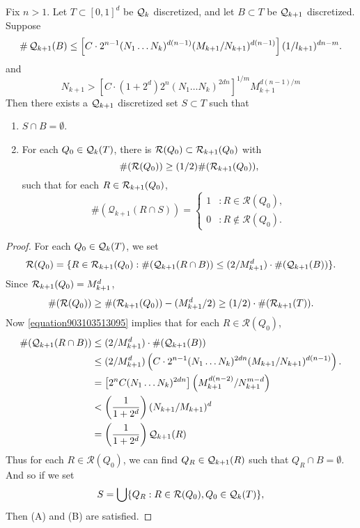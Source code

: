 \begin{lemma} \label{Lemma1209410535}
    Fix $n > 1$. Let $T \subset [0,1]^d$ be $\operatorname{\mathcal{Q}}_k$ discretized, and let $B \subset T$ be $\operatorname{\mathcal{Q}}_{k+1}$ discretized. Suppose
    \[ \# \operatorname{\mathcal{Q}}_{k+1}(B) \leq \left[ C \cdot 2^{n-1} (N_1 \dots N_k)^{d(n-1)} (M_{k+1}/N_{k+1})^{d(n-1)} \right] (1/l_{k+1})^{dn - m}. \]
    and
    \begin{equation} \label{equation903103513095}
        N_{k+1} > \left[ C \cdot (1 + 2^d) 2^n (N_1 \dots N_k)^{2dn} \right]^{1/m} M_{k+1}^{d(n-1)/m}
    \end{equation}
    Then there exists a $\operatorname{\mathcal{Q}}_{k+1}$ discretized set $S \subset T$ such that
    \begin{enumerate}
        \item $S \cap B = \emptyset$.
        \item \label{badsetproperty5} For each $Q_0 \in \operatorname{\mathcal{Q}}_k(T)$, there is $\mathcal{R}(Q_0) \subset \operatorname{\mathcal{R}}_{k+1}(Q_0)$ with
        \[ \#(\mathcal{R}(Q_0)) \geq (1/2) \#(\operatorname{\mathcal{R}}_{k+1}(Q_0)), \]
        such that for each $R \in \operatorname{\mathcal{R}}_{k+1}(Q_0)$,
        \[ \#(\mathcal{Q}_{k+1}(R \cap S)) = \begin{cases} 1 &: R \in \mathcal{R}(Q_0), \\ 0 &: R \not \in \mathcal{R}(Q_0). \end{cases} \]
    \end{enumerate}
\end{lemma}
\begin{proof}
    For each $Q_0 \in \operatorname{\mathcal{Q}}_k(T)$, we set
    \[ \mathcal{R}(Q_0) = \{ R \in \operatorname{\mathcal{R}}_{k+1}(Q_0) : \#(\operatorname{\mathcal{Q}}_{k+1}(R \cap B)) \leq (2/M_{k+1}^d) \cdot \#(\operatorname{\mathcal{Q}}_{k+1}(B)) \}. \]
    Since $\operatorname{\mathcal{R}}_{k+1}(Q_0) = M_{k+1}^d$,
    \[ \#(\mathcal{R}(Q_0)) \geq \#(\operatorname{\mathcal{R}}_{k+1}(Q_0)) - (M_{k+1}^d/2) \geq (1/2) \cdot \#(\operatorname{\mathcal{R}}_{k+1}(T)). \]
    Now \eqref{equation903103513095} implies that for each $R \in \mathcal{R}(Q_0)$,
    \begin{align*}
        \#(\operatorname{\mathcal{Q}}_{k+1}(R \cap B)) &\leq (2/M_{k+1}^d) \cdot \#(\operatorname{\mathcal{Q}}_{k+1}(B))\\
        &\leq (2/M_{k+1}^d) \left(C \cdot 2^{n-1} (N_1 \dots N_k)^{2dn} (M_{k+1}/N_{k+1})^{d(n-1)} \right).\\
        &= \left[ 2^n C (N_1 \dots N_k)^{2dn} \right] \left( M_{k+1}^{d(n-2)} / N_{k+1}^{m-d} \right)\\
        &< \left( \frac{1}{1 + 2^d} \right) (N_{k+1}/M_{k+1})^d\\
        &= \left( \frac{1}{1 + 2^d} \right) \operatorname{\mathcal{Q}}_{k+1}(R)
    \end{align*}
    Thus for each $R \in \mathcal{R}(Q_0)$, we can find $Q_R \in \operatorname{\mathcal{Q}}_{k+1}(R)$ such that $Q_R \cap B = \emptyset$. And so if we set
    \[ S = \bigcup \{ Q_R : R \in \mathcal{R}(Q_0), Q_0 \in \operatorname{\mathcal{Q}}_k(T) \}, \]
    Then (A) and (B) are satisfied.
\end{proof}


